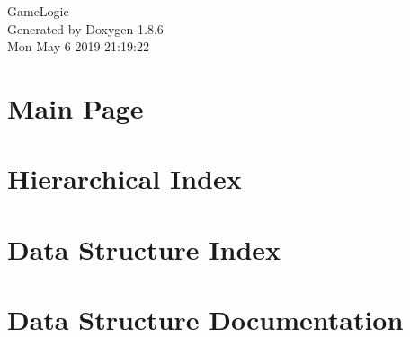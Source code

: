 \documentclass[twoside]{book}
\newcommand{\clearemptydoublepage}{%
  \newpage{\pagestyle{empty}\cleardoublepage}%
}
\begin{document}
\hypersetup{pageanchor=false}
\begin{titlepage}
\vspace*{7cm}
\begin{center}%
{\Large Game\-Logic }\\
\vspace*{1cm}
{\large Generated by Doxygen 1.8.6}\\
\vspace*{0.5cm}
{\small Mon May 6 2019 21:19:22}\\
\end{center}
\end{titlepage}
\clearemptydoublepage
\tableofcontents
\clearemptydoublepage
{}
\hypersetup{pageanchor=true}

\chapter{Main Page}
\label{index}\hypertarget{index}{}
\chapter{Hierarchical Index}

\chapter{Data Structure Index}

\chapter{Data Structure Documentation}




























\newpage
{}
{}
\printindex
\end{document}
